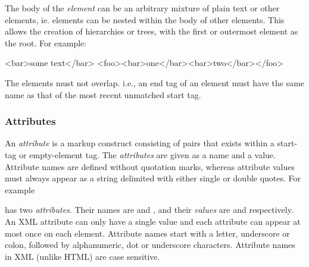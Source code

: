 The body of the \textit{element} can be an arbitrary mixture of plain text or other elements, ie. elements can be nested within the body of
other elements.  This allows the creation of hierarchies or trees, with the first or outermost element as the root.
For example:
\begin{XML}
<bar>some text</bar>
<foo><bar>one</bar><bar>two</bar></foo>
\end{XML}

The elements must not overlap. i.e., an end tag of an element must have the same name as that of the most recent unmatched start tag.

\subsubsection{Attributes}

An \emph{attribute} is a markup construct consisting of  pairs that exists within a start-tag or empty-element tag. 
The \textit{attributes} are given as a name and a value.
Attribute names are defined without quotation marks, whereas attribute values must always appear as a string delimited with either single or double quotes.
For example
\begin{quote}
\end{quote}
has two \emph{attributes}.  Their names are  and , and their \emph{values} are  and  respectively.  
An XML attribute can only have a single value and each attribute can appear at most once on each element.
Attribute names start with a letter, underscore or colon, followed by alphanumeric, dot or underscore characters.  
Attribute names in XML (unlike HTML) are case sensitive. 

